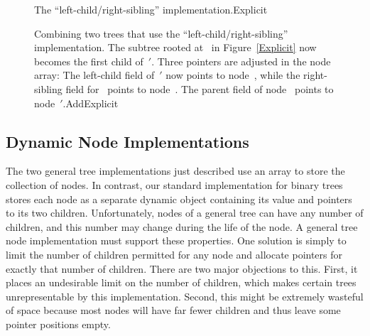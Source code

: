 \begin{figure}
\vspace{-\bigskipamount}\vspace{-\bigskipamount}
\vspace{-\smallskipamount}

{The ``left-child/right-sibling'' implementation.}{Explicit}
\end{figure}

\begin{figure}
\vspace{-\medskipamount}

{Combining two trees that use the ``left-child/right-sibling''
implementation.
The subtree rooted at~ in Figure~\ref{Explicit} now becomes
the first child of~\('\).
Three pointers are adjusted in the node array:
The left-child field of~\('\) now points to node~, while
the right-sibling field for~ points to node~.
The parent field of node~ points to
node~\('\).}{AddExplicit}
\bigskip
\end{figure}

\subsection{Dynamic Node Implementations}
\label{LinkedSec}

The two general tree implementations just described use an
array to store the collection of nodes.
In contrast, our standard implementation for binary trees stores each
node as a separate dynamic object containing its value and pointers to
its two children.
Unfortunately, nodes of a general tree can have any number of
children, and this number may change during the life of the node.
A general tree node implementation must support these properties.
One solution is simply to limit the number of children permitted for
any node and allocate pointers for exactly that number of children.
There are two major objections to this.
First, it places an undesirable limit on the number of children, which
makes certain trees unrepresentable by this implementation.
Second, this might be extremely wasteful of space because most
nodes will have far fewer children and thus leave some pointer
positions empty.

